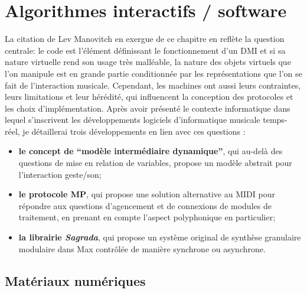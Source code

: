 %
\chapter{Algorithmes interactifs / software}
\label{ch:algorithms}


\vspace*{\fill}

\noindent La citation de Lev Manovitch en exergue de ce chapitre en reflète la question centrale: le code est l'élément définissant le fonctionnement d'un \gls{DMI} et si sa nature virtuelle rend son usage très malléable, la nature des objets virtuels que l'on manipule est en grande partie conditionnée par les représentations que l'on se fait de l'interaction musicale. Cependant, les machines ont aussi leurs contraintes, leurs limitations et leur hérédité, qui influencent la conception des protocoles et les choix d'implémentation. Après avoir présenté le contexte informatique dans lequel s'inscrivent les développements logiciels d'informatique musicale temps-réel, je détaillerai trois développements en lien avec ces questions :
\vspace{-1em}
\begin{itemize}[noitemsep]
	\item \textbf{le concept de ``modèle intermédiaire dynamique''}, qui au-delà des questions de mise en relation de variables, propose un modèle abstrait pour l'interaction geste/son;
	\item \textbf{le protocole MP}, qui propose une solution alternative au \gls{MIDI} pour répondre aux questions d'agencement et de connexions de modules de traitement, en prenant en compte l'aspect polyphonique en particulier;
	\item \textbf{la librairie \textit{Sagrada}}, qui propose un système original de synthèse granulaire modulaire dans Max contrôlée de manière synchrone ou asynchrone.
\end{itemize}

\clearpage

\section{Matériaux numériques}
\label{ch:algorithms:digital-material}

